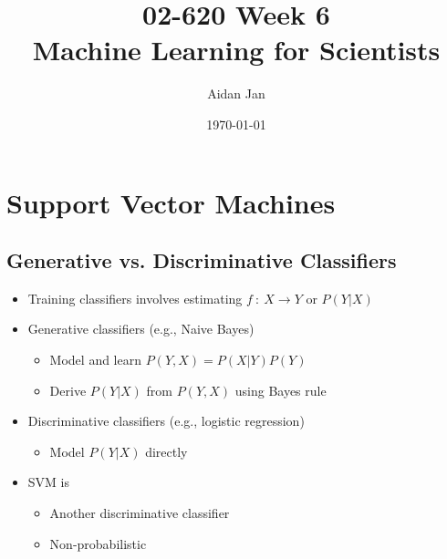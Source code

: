 \documentclass[10pt]{article}
\title{02-620 Week 6 \\ \large{Machine Learning for Scientists}}
\author{Aidan Jan}
\date{\today}
\begin{document}
\maketitle

\section*{Support Vector Machines}
\subsection*{Generative vs. Discriminative Classifiers}
\begin{itemize}
	\item Training classifiers involves estimating $f \::\: X \rightarrow Y$ or $P(Y | X)$
	\item Generative classifiers (e.g., Naive Bayes)
	\begin{itemize}
	    \item Model and learn $P(Y, X) = P(X | Y) P(Y)$
	    \item Derive $P(Y | X)$ from $P(Y, X)$ using Bayes rule
    \end{itemize}
    \item Discriminative classifiers (e.g., logistic regression)
    \begin{itemize}
	    \item Model $P(Y | X)$ directly
    \end{itemize}
    \item SVM is
    \begin{itemize}
	    \item Another discriminative classifier
	    \item Non-probabilistic
    \end{itemize}
\end{itemize}
\end{document}

